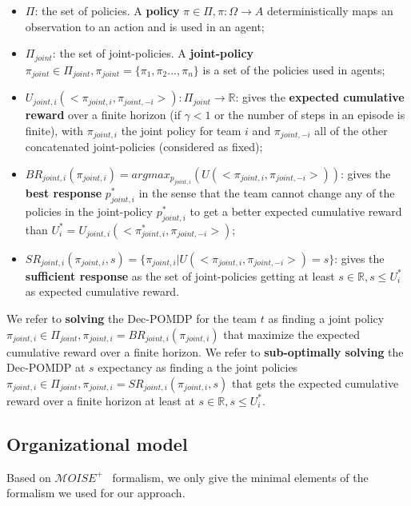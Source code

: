 \documentclass[runningheads]{llncs}
\begin{document}
\begin{itemize}
    \item $\Pi$: the set of policies. A \textbf{policy} $\pi \in \Pi, \pi: \Omega \rightarrow A$ deterministically maps an observation to an action and is used in an agent;
    \item $\Pi_{joint}$: the set of joint-policies. A \textbf{joint-policy} $\pi_{joint} \in \Pi_{joint}, \pi_{joint} = \{\pi_1, \pi_2...,\pi_n\}$ is a set of the policies used in agents;
    \item $U_{joint,i}(<\pi_{joint,i}, \pi_{joint,-i}>): \Pi_{joint} \rightarrow \mathbb{R}$: gives the \textbf{expected cumulative reward} over a finite horizon (if $\gamma < 1$ or the number of steps in an episode is finite), with $\pi_{joint,i}$ the joint policy for team $i$ and $\pi_{joint,-i}$ all of the other concatenated joint-policies (considered as fixed);
    \item $BR_{joint,i}(\pi_{joint,i}) = argmax_{p_{joint,i}}(U(<\pi_{joint,i},\pi_{joint,-i}>))$: gives the \textbf{best response} $p_{joint,i}^*$ in the sense that the team cannot change any of the policies in the joint-policy $p_{joint,i}^*$ to get a better expected cumulative reward than $U_i^* = U_{joint,i}(<\pi_{joint,i}^*, \pi_{joint,-i}>)$;
    \item $SR_{joint,i}(\pi_{joint,i}, s) = \{\pi_{joint,i} | U(<\pi_{joint,i},\pi_{joint,-i}>) = s\}$: gives the \textbf{sufficient response} as the set of joint-policies getting at least $s \in \mathbb{R}, s \leq U_i^*$ as expected cumulative reward.
\end{itemize}

We refer to \textbf{solving} the Dec-POMDP for the team $t$ as finding a joint policy $\pi_{joint,i} \in \Pi_{joint}, \pi_{joint,i} = BR_{joint,i}(\pi_{joint,i})$ that maximize the expected cumulative reward over a finite horizon.
We refer to \textbf{sub-optimally solving} the Dec-POMDP at $s$ expectancy as finding a the joint policies $\pi_{joint,i} \in \Pi_{joint}, \pi_{joint,i} = SR_{joint,i}(\pi_{joint,i}, s)$ that gets the expected cumulative reward over a finite horizon at least at $s \in \mathbb{R}, s \leq U_i^*$.

\subsection{Organizational model}

Based on $\mathcal{M}OISE^+$~\cite{Hubner2007} formalism, we only give the minimal elements of the formalism we used for our approach.
\end{document}
